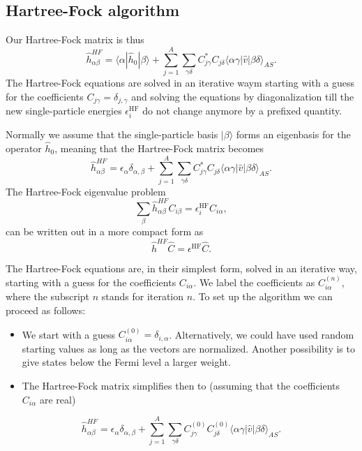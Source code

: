 \documentclass[%
twoside,                 %
final,                   %
10pt]{article}
\begin{document}
\subsection*{Hartree-Fock algorithm}

Our Hartree-Fock matrix  is thus
\[
\hat{h}_{\alpha\beta}^{HF}=\langle \alpha | \hat{h}_0 | \beta \rangle+
\sum_{j=1}^A\sum_{\gamma\delta} C^*_{j\gamma}C_{j\delta}\langle \alpha\gamma|\hat{v}|\beta\delta\rangle_{AS}.
\]
The Hartree-Fock equations are solved in an iterative waym starting with a guess for the coefficients $C_{j\gamma}=\delta_{j,\gamma}$ and solving the equations by diagonalization till the new single-particle energies
$\epsilon_i^{\mathrm{HF}}$ do not change anymore by a prefixed quantity. 




Normally we assume that the single-particle basis $|\beta\rangle$ forms an eigenbasis for the operator
$\hat{h}_0$, meaning that the Hartree-Fock matrix becomes  
\[
\hat{h}_{\alpha\beta}^{HF}=\epsilon_{\alpha}\delta_{\alpha,\beta}+
\sum_{j=1}^A\sum_{\gamma\delta} C^*_{j\gamma}C_{j\delta}\langle \alpha\gamma|\hat{v}|\beta\delta\rangle_{AS}.
\]
The Hartree-Fock eigenvalue problem
\[
\sum_{\beta}\hat{h}_{\alpha\beta}^{HF}C_{i\beta}=\epsilon_i^{\mathrm{HF}}C_{i\alpha},
\]
can be written out in a more compact form as
\[
\hat{h}^{HF}\hat{C}=\epsilon^{\mathrm{HF}}\hat{C}. 
\]




The Hartree-Fock equations are, in their simplest form, solved in an iterative way, starting with a guess for the
coefficients $C_{i\alpha}$. We label the coefficients as $C_{i\alpha}^{(n)}$, where the subscript $n$ stands for iteration $n$.
To set up the algorithm we can proceed as follows:

\begin{itemize}
 \item We start with a guess $C_{i\alpha}^{(0)}=\delta_{i,\alpha}$. Alternatively, we could have used random starting values as long as the vectors are normalized. Another possibility is to give states below the Fermi level a larger weight.

 \item The Hartree-Fock matrix simplifies then to (assuming that the coefficients $C_{i\alpha} $  are real)
\end{itemize}

\noindent
\[
\hat{h}_{\alpha\beta}^{HF}=\epsilon_{\alpha}\delta_{\alpha,\beta}+
\sum_{j = 1}^A\sum_{\gamma\delta} C_{j\gamma}^{(0)}C_{j\delta}^{(0)}\langle \alpha\gamma|\hat{v}|\beta\delta\rangle_{AS}.
\]
\end{document}
